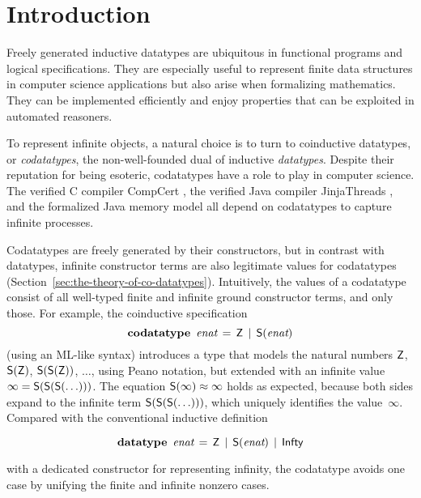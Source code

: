 \begin{nomemoriam}
\smallskipamount
\end{nomemoriam}

\setcounter{footnote}{0}

\section{Introduction}
\label{sec:introduction}

Freely generated inductive datatypes are ubiquitous in functional programs and
logical specifications. They are especially
useful to represent finite data structures in computer science applications but
also arise when formalizing mathematics.
They can be implemented efficiently and enjoy
properties that can be exploited in automated reasoners.
%

To represent infinite objects, %
a natural choice is to turn to coinductive datatypes, or \emph{codatatypes},
the non-well-founded dual of inductive \emph{datatypes}.
%
Despite their reputation for being esoteric, codatatypes have a
role to play in computer science. The verified C compiler CompCert
\cite{leroy-2009}, the verified Java compiler Jinja\-Threads
\cite{lochbihler-2010-jinja}, and the formalized Java memory model
\cite{lochbihler-2014-jmm} all depend on codatatypes to capture infinite
processes.

Codatatypes are freely generated by their constructors, but in contrast with datatypes,
infinit\-e constructor terms are also legitimate values for codatatypes
(Section~\ref{sec:the-theory-of-co-datatypes}). Intuitively, the
values of a codatatype consist of all well-typed finite and infinite ground
constructor
terms, and only those. For example, the coinductive specification
%
\[\textbf{codatatype}~\,\textit{enat} \,=\, \textsf{Z} \,\mid\, \textsf{S}(\textit{enat})\]
%
(using an ML-like syntax) introduces a type that
models the natural numbers $\textsf{Z}$, $\textsf{S}(\textsf{Z})$, $\textsf{S}(\textsf{S}(\textsf{Z}))$, $\ldots$\afterLdots{},
using Peano notation, but extended with an
infinite value $\infty = \textsf{S}(\textsf{S}(\textsf{S}(\ldots)))$.
The equation $\textsf{S}(\infty) \approx \infty$ holds as expected,
because both sides expand to the infinite term
$\textsf{S}(\textsf{S}(\textsf{S}(\ldots)))$, which uniquely identifies the
value~$\infty$.
Compared with the conventional inductive definition
\begin{rep}
\[\textbf{datatype}~\,\textit{enat} \,=\, \textsf{Z} \,\mid\, \textsf{S}(\textit{enat}) \,\mid\, \textsf{Infty}\]
\end{rep}
with a dedicated constructor for representing infinity, the codatatype avoids
one case by unifying the finite and infinite nonzero cases.


